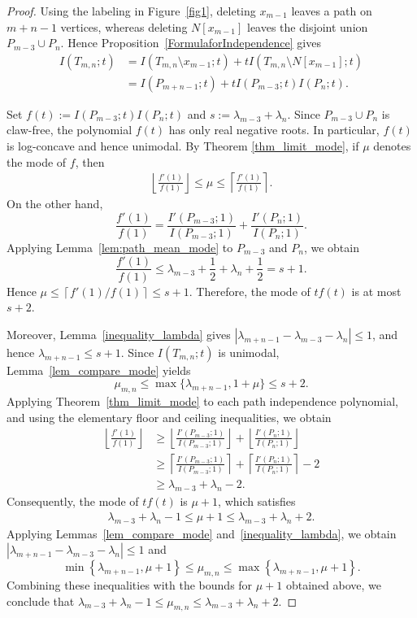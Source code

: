 \documentclass[12pt,twoside]{amsart}
\theoremstyle{definition}
\theoremstyle{mystyle}
\newcommand{\brb}[1]{\left\{#1\right\}}
\newcommand{\abs}[1]{\left| #1\right|}
\newcommand{\ceil}[1]{ \left \lceil #1 \right \rceil}
\newcommand{\flo}[1]{\left \lfloor #1 \right\rfloor}
\begin{document}
\begin{proof}
Using the labeling in Figure~\ref{fig1}, deleting $x_{m-1}$ leaves
a path on $m+n-1$ vertices, whereas deleting $N[x_{m-1}]$ leaves
the disjoint union $P_{m-3}\cup P_n$. Hence Proposition~\ref{FormulaforIndependence}
gives 
\begin{align*}
I(T_{m,n};t)
&=I(T_{m,n}\setminus x_{m-1};t)
+tI(T_{m,n}\setminus N[x_{m-1}];t)\\
&=I(P_{m+n-1};t)
+tI(P_{m-3};t)I(P_n;t).
\end{align*}

Set $f(t):=I(P_{m-3};t)I(P_n;t)$ and
$s:=\lambda_{m-3}+\lambda_n$.
Since $P_{m-3}\cup P_n$ is claw-free, the polynomial $f(t)$ has only
real negative roots. In particular, $f(t)$ is log-concave and hence
unimodal. By Theorem \ref{thm_limit_mode}, if $\mu$ denotes the mode of $f$, then
    \begin{align*}
        \flo{\frac{f'(1)}{f(1)}}\leq \mu\leq \ceil{\frac{f'(1)}{f(1)}}.
    \end{align*}
On the other hand,
\[
\frac{f'(1)}{f(1)}
=
\frac{I'(P_{m-3};1)}{I(P_{m-3};1)}
+
\frac{I'(P_n;1)}{I(P_n;1)}.
\]
Applying Lemma~\ref{lem:path_mean_mode} to $P_{m-3}$ and $P_n$, we
obtain
\[
\frac{f'(1)}{f(1)}
\leq
\lambda_{m-3}+\frac12+\lambda_n+\frac12
=s+1.
\]
Hence $\mu\leq
\left\lceil f'(1)/f(1)\right\rceil\leq s+1$. Therefore, the mode of
$tf(t)$ is at most $s+2$.

Moreover, Lemma~\ref{inequality_lambda} gives
$|\lambda_{m+n-1}-\lambda_{m-3}-\lambda_n|\leq1$, and hence
$\lambda_{m+n-1}\leq s+1$. Since $I(T_{m,n};t)$ is unimodal, Lemma~\ref{lem_compare_mode} yields
\[
\mu_{m,n}
\leq
\max\{\lambda_{m+n-1},1+\mu\}
\leq s+2.
\]
Applying Theorem~\ref{thm_limit_mode} to each path
independence polynomial, and using the elementary
floor and ceiling inequalities, we obtain
\begin{align*}
        \flo{\frac{f'(1)}{f(1)}}&\geq \flo{\frac{I'(P_{m-3};1)}{I(P_{m-3};1)}}+\flo{\frac{I'(P_n;1)}{I(P_n;1)}}\\
        &\geq \ceil{\frac{I'(P_{m-3};1)}{I(P_{m-3};1)}}+ \ceil{\frac{I'(P_n;1)}{I(P_n;1)}}-2\\
        &\geq \lambda_{m-3}+\lambda_n-2.
    \end{align*}
    Consequently, the mode of $tf(t)$ is $\mu+1$, which satisfies
    \begin{align*}
        \lambda_{m-3}+\lambda_n-1\leq \mu+1\leq \lambda_{m-3}+\lambda_n+2.
    \end{align*}
Applying Lemmas~\ref{lem_compare_mode} and~\ref{inequality_lambda}, we obtain
$\abs{\lambda_{m+n-1}-\lambda_{m-3}-\lambda_n}\leq 1$ and
\[
\min\brb{\lambda_{m+n-1},\mu+1}
\leq \mu_{m,n}
\leq
\max\brb{\lambda_{m+n-1},\mu+1}.
\]
Combining these inequalities with the bounds for $\mu+1$ obtained above, we conclude that
$\lambda_{m-3}+\lambda_n-1\leq\mu_{m,n}
\leq\lambda_{m-3}+\lambda_n+2$.
\end{proof}
\end{document}
